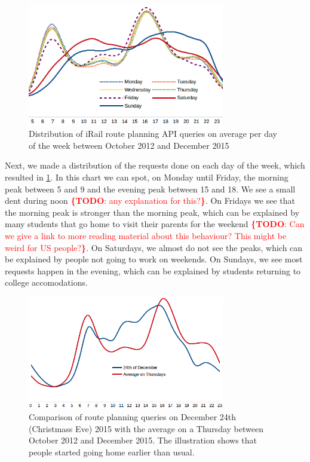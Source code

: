 \documentclass{sig-alternate}
\newcommand{\todo}[1]{\noindent\textcolor{red}{{\bf \{TODO}: #1{\bf \}}}}
\begin{document}
\begin{figure}
\centering
\includegraphics[width=8.6cm]{avg-all}
\caption{Distribution of iRail route planning API queries on average per day of the week between October 2012 and December 2015}
\label{fig:average}
\end{figure}

Next, we made a distribution of the requests done on each day of the week, which resulted in \cref{fig:average}.
In this chart we can spot, on Monday until Friday, the morning peak between 5 and 9 and the evening peak between 15 and 18.
We see a small dent during noon \todo{any explanation for this?}.
On Fridays we see that the morning peak is stronger than the morning peak, which can be explained by many students that go home to visit their parents for the weekend \todo{Can we give a link to more reading material about this behaviour? This might be weird for US people?}.
On Saturdays, we almost do not see the peaks, which can be explained by people not going to work on weekends.
On Sundays, we see most requests happen in the evening, which can be explained by students returning to college accomodations.

\begin{figure}
\centering
\includegraphics[width=8.6cm]{dec24}
\caption{Comparison of route planning queries on December 24th (Christmass Eve) 2015 with the average on a Thursday between October 2012 and December 2015. The illustration shows that people started going home earlier than usual.}
\label{fig:dec24}
\end{figure}
\end{document}
